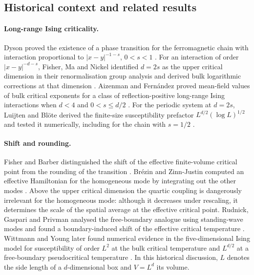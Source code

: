 \documentclass[11pt]{article}
\theoremstyle{definition}
\begin{document}
\subsection{Historical context and related results}

\paragraph{Long-range Ising criticality.}
Dyson proved the existence of a phase transition for the ferromagnetic
chain with interaction proportional to $|x-y|^{-1-s}$,
$0<s<1$ \cite{Dyson1969}. For an interaction of order
$|x-y|^{-d-s}$, Fisher, Ma and Nickel identified $d=2s$ as the upper
critical dimension in their renormalisation group analysis and derived
bulk logarithmic corrections at that dimension \cite{FisherMaNickel1972}.
Aizenman and Fern\'andez proved mean-field values of bulk critical
exponents for a class of reflection-positive long-range Ising interactions
when $d<4$ and $0<s\le d/2$ \cite{AizenmanFernandez1988}.
For the periodic system at $d=2s$, Luijten and Bl\"ote derived the
finite-size susceptibility prefactor $L^{d/2}(\log L)^{1/2}$ and tested
it numerically, including for the chain with $s=1/2$
\cite[Eq.~(27) and Table~V]{LuijtenBlote1997}.

\paragraph{Shift and rounding.}
Fisher and Barber distinguished the shift of the effective finite-volume
critical point from the rounding of the transition
\cite{FisherBarber1972}. Br\'ezin and Zinn-Justin computed an effective
Hamiltonian for the homogeneous mode by integrating out the other modes
\cite{BrezinZinnJustin1985}. Above the upper critical dimension the
quartic coupling is dangerously irrelevant for the homogeneous mode:
although it decreases under rescaling, it determines the scale of the
spatial average at the effective critical point. Rudnick, Gaspari and
Privman analysed the free-boundary analogue using standing-wave modes
and found a boundary-induced shift of the effective critical temperature
\cite{RudnickGaspariPrivman1985}. Wittmann and Young later found numerical
evidence in the five-dimensional Ising model for susceptibility of
order $L^2$ at the bulk critical temperature and $L^{d/2}$ at a
free-boundary pseudocritical temperature \cite{WittmannYoung2014}.
In this historical discussion, $L$ denotes the side length of a
$d$-dimensional box and $V=L^d$ its volume.
\end{document}
